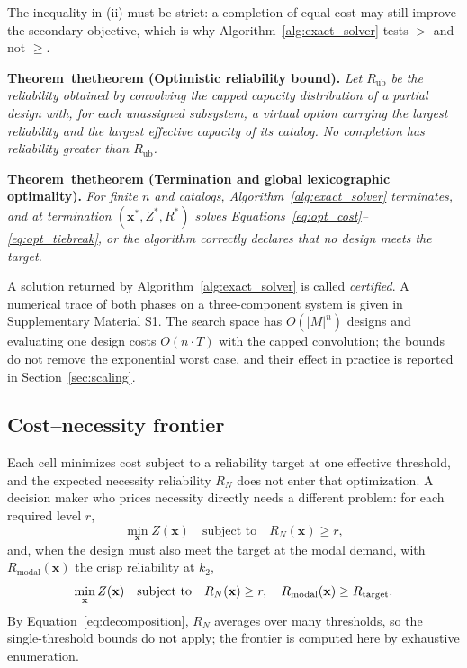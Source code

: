 \documentclass[Review,sagev,times]{sagej}%
\newcommand{\stmt}[3]{\refstepcounter{#1}\label{#2}#3~\csname the#1\endcsname}
\begin{document}
The inequality in (ii) must be strict: a completion of equal cost may still improve the secondary objective,
which is why Algorithm~\ref{alg:exact_solver} tests $>$ and not $\ge$.

\textbf{\stmt{theorem}{thm:rel_bound}{Theorem} (Optimistic reliability bound).}
\textit{Let $R_{\mathrm{ub}}$ be the reliability obtained by convolving the capped capacity distribution of a
partial design with, for each unassigned subsystem, a virtual option carrying the largest reliability and the
largest effective capacity of its catalog. No completion has reliability greater than $R_{\mathrm{ub}}$.}

\textbf{\stmt{theorem}{thm:optimality}{Theorem} (Termination and global lexicographic optimality).}
\textit{For finite $n$ and catalogs, Algorithm~\ref{alg:exact_solver} terminates, and at termination
$(\mathbf{x}^*, Z^*, R^*)$ solves Equations~\eqref{eq:opt_cost}--\eqref{eq:opt_tiebreak}, or the algorithm
correctly declares that no design meets the target.}

A solution returned by Algorithm~\ref{alg:exact_solver} is called \emph{certified}. A numerical trace of both
phases on a three-component system is given in Supplementary Material S1. The search space has $O(|M|^n)$
designs and evaluating one design costs $O(n\cdot T)$ with the capped convolution; the bounds do not remove the
exponential worst case, and their effect in practice is reported in Section~\ref{sec:scaling}.

\subsection{Cost--necessity frontier} \label{sec:frontier_model}
Each cell minimizes cost subject to a reliability target at one effective threshold, and the expected
necessity reliability $R_N$ does not enter that optimization. A decision maker who prices necessity directly
needs a different problem: for each required level $r$,
\begin{equation}
\min_{\mathbf{x}} Z(\mathbf{x}) \quad \text{subject to} \quad R_N(\mathbf{x}) \ge r,
\label{eq:biobjective_pareto}
\end{equation}
and, when the design must also meet the target at the modal demand, with $R_{\mathrm{modal}}(\mathbf{x})$ the
crisp reliability at $k_2$,
\begin{equation}
\min_{\mathbf{x}} Z(\mathbf{x}) \quad \text{subject to} \quad R_N(\mathbf{x}) \ge r, \quad R_{\mathrm{modal}}(\mathbf{x}) \ge R_{\mathrm{target}}.
\label{eq:biobjective_pareto_adequate}
\end{equation}
By Equation~\eqref{eq:decomposition}, $R_N$ averages over many thresholds, so the single-threshold bounds do not
apply; the frontier is computed here by exhaustive enumeration.
\end{document}
